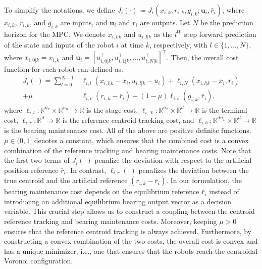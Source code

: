 To simplify the notations, we define $J_i(\cdot) \coloneq J_i(x_{i,k}, r_{i,k}, g_{i,k}; \mathbf{u}_i, \bar{r}_i)$, where $x_{i,k}, \ r_{i,k}$, and $g_{i,k}$ are inputs, and $\mathbf{u}_i$ and $\bar{r}_i$ are outputs. Let $N$ be the prediction horizon for the MPC. We denote $x_{i,l|k}$ and $u_{i,l|k}$ as the $l^{\text{th}}$ step forward prediction of the state and inputs of the robot $i$ at time $k$, respectively, with $l \in \{1,\dots, N\}$, where $x_{i,0|k} = x_{i,k}$ and $\mathbf{u}_i = [u_{i,0|k}^\top, u_{i,1|k}^\top, \dots, u_{i,N|k}^\top]^\top$. Then, the overall cost function for each robot can defined as:
\begin{align}
\label{eq:mpc_cost}
 J_i(\cdot) = \sum_{l=0}^{N-1} &\ell_{i,l}(x_{i,l|k} - \bar{x}_{i}, u_{i,l|k} -  \bar{u}_i) + \ell_{i,N}(x_{i,l|k} - \bar{x}_i, \bar{r}_i) \nonumber
 \\+ \mu &\ell_{i,r}(r_{i,k} - \bar{r}_i) + (1-\mu)\ell_{i,b}(g_{i,k}, \bar{r}_i),    
\end{align}
where $\ell_{i,l}: \mathbb{R}^{n_x} \times \mathbb{R}^{n_u} \rightarrow \mathbb{R}$ is the stage cost, $\ell_{i,N}: \mathbb{R}^{n_x} \times \mathbb{R}^{d} \rightarrow \mathbb{R}$ is the terminal cost, $\ell_{i,r}: \mathbb{R}^{d} \rightarrow \mathbb{R}$ is the reference centroid tracking cost, and $\ell_{i,b}: \mathbb{R}^{dn_x} \times \mathbb{R}^{d} \rightarrow \mathbb{R}$ is the bearing maintenance cost. All of the above are positive definite functions. $\mu\in(0,1]$ denotes a constant, which ensures that the combined cost is a convex combination of the reference tracking and bearing maintenance costs. Note that the first two terms of $J_i(\cdot)$ penalize the deviation with respect to the artificial position reference $\bar{r}_i$. In contrast, $\ell_{i,r}(\cdot)$ penalizes the deviation between the true centroid and the artificial reference $(r_{i,k} - \bar{r}_i)$. In our formulation, the bearing maintenance cost depends on the equilibrium reference $\bar{r}_i$ instead of introducing an additional equilibrium bearing output vector as a decision variable. This crucial step allows us to construct a coupling between the centroid reference tracking and bearing maintenance costs. Moreover, keeping $\mu>0$ ensures that the reference centroid tracking is always achieved. Furthermore, by constructing a convex combination of the two costs, the overall cost is convex and has a unique minimizer, i.e., one that ensures that the robots reach the centroidal Voronoi configuration.

